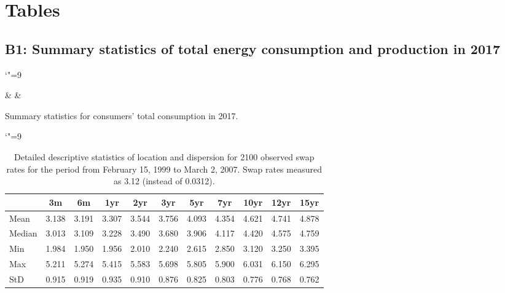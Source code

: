 
\section{Tables}\label{App:Tables}

\subsection{B1: Summary statistics of total energy consumption and production in 2017} \label{App:Tables:totalcons}

\begingroup\catcode`"=9

\begin{table}[ht]
    {\csvcoli & \csvcolii & \csvcoliii}%
    \caption[Summary statistics for consumers' total consumption in 2017]{Summary statistics for consumers' total consumption in 2017. \quantnet}
    \label{App:Tab:cons_totalcons}
\end{table}

\endgroup\catcode`"=9




\begin{table}[ht]
    \begin{center}
        {\footnotesize
        \begin{tabular}{l|cccccccccc}
        \hline \hline
                        & 3m    & 6m    & 1yr   & 2yr   & 3yr   & 5yr   & 7yr   & 10yr  & 12yr  & 15yr   \\
            \hline
                Mean   & 3.138 & 3.191 & 3.307 & 3.544 & 3.756 & 4.093 & 4.354 & 4.621 & 4.741 & 4.878  \\
                Median & 3.013 & 3.109 & 3.228 & 3.490 & 3.680 & 3.906 & 4.117 & 4.420 & 4.575 & 4.759  \\
                Min    & 1.984 & 1.950 & 1.956 & 2.010 & 2.240 & 2.615 & 2.850 & 3.120 & 3.250 & 3.395  \\
                Max    & 5.211 & 5.274 & 5.415 & 5.583 & 5.698 & 5.805 & 5.900 & 6.031 & 6.150 & 6.295  \\
                StD    & 0.915 & 0.919 & 0.935 & 0.910 & 0.876 & 0.825 & 0.803 & 0.776 & 0.768 & 0.762  \\
            \hline \hline
        \end{tabular}}
    \end{center}
    \caption{Detailed descriptive statistics of location and dispersion for
    2100 observed swap rates for the period from
    February 15, 1999 to March 2, 2007. Swap rates measured as 3.12 (instead of 0.0312).}
    \label{Tab:DescripStatsRawDataDetail}
\end{table}
